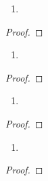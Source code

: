\documentclass[12pt]{amsart}
\begin{document}
\begin{enumerate}
  \item[18.] {
    }
\end{enumerate}

\begin{proof}
\end{proof}

\begin{enumerate}
  \item[19.] {
    }
\end{enumerate}

\begin{proof}
\end{proof}

\begin{enumerate}
  \item[20.] {
    }
\end{enumerate}

\begin{proof}
\end{proof}

\begin{enumerate}
  \item[21.] {
    }
\end{enumerate}

\begin{proof}
\end{proof}
\end{document}
